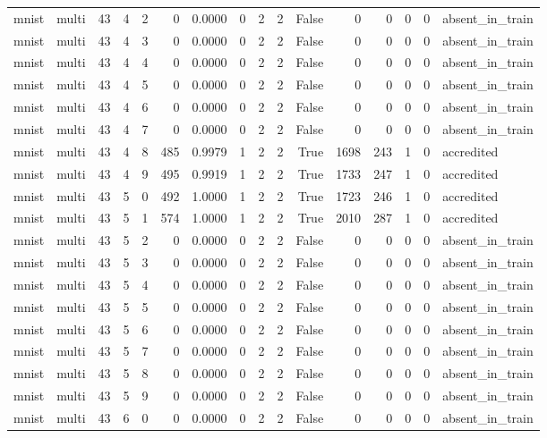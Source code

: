 \begin{tabular}{llrrrrrrrrrrrrrl}
mnist & multi & 43 & 4 & 2 & 0 & 0.0000 & 0 & 2 & 2 & False & 0 & 0 & 0 & 0 & absent\_in\_train \\
mnist & multi & 43 & 4 & 3 & 0 & 0.0000 & 0 & 2 & 2 & False & 0 & 0 & 0 & 0 & absent\_in\_train \\
mnist & multi & 43 & 4 & 4 & 0 & 0.0000 & 0 & 2 & 2 & False & 0 & 0 & 0 & 0 & absent\_in\_train \\
mnist & multi & 43 & 4 & 5 & 0 & 0.0000 & 0 & 2 & 2 & False & 0 & 0 & 0 & 0 & absent\_in\_train \\
mnist & multi & 43 & 4 & 6 & 0 & 0.0000 & 0 & 2 & 2 & False & 0 & 0 & 0 & 0 & absent\_in\_train \\
mnist & multi & 43 & 4 & 7 & 0 & 0.0000 & 0 & 2 & 2 & False & 0 & 0 & 0 & 0 & absent\_in\_train \\
mnist & multi & 43 & 4 & 8 & 485 & 0.9979 & 1 & 2 & 2 & True & 1698 & 243 & 1 & 0 & accredited \\
mnist & multi & 43 & 4 & 9 & 495 & 0.9919 & 1 & 2 & 2 & True & 1733 & 247 & 1 & 0 & accredited \\
mnist & multi & 43 & 5 & 0 & 492 & 1.0000 & 1 & 2 & 2 & True & 1723 & 246 & 1 & 0 & accredited \\
mnist & multi & 43 & 5 & 1 & 574 & 1.0000 & 1 & 2 & 2 & True & 2010 & 287 & 1 & 0 & accredited \\
mnist & multi & 43 & 5 & 2 & 0 & 0.0000 & 0 & 2 & 2 & False & 0 & 0 & 0 & 0 & absent\_in\_train \\
mnist & multi & 43 & 5 & 3 & 0 & 0.0000 & 0 & 2 & 2 & False & 0 & 0 & 0 & 0 & absent\_in\_train \\
mnist & multi & 43 & 5 & 4 & 0 & 0.0000 & 0 & 2 & 2 & False & 0 & 0 & 0 & 0 & absent\_in\_train \\
mnist & multi & 43 & 5 & 5 & 0 & 0.0000 & 0 & 2 & 2 & False & 0 & 0 & 0 & 0 & absent\_in\_train \\
mnist & multi & 43 & 5 & 6 & 0 & 0.0000 & 0 & 2 & 2 & False & 0 & 0 & 0 & 0 & absent\_in\_train \\
mnist & multi & 43 & 5 & 7 & 0 & 0.0000 & 0 & 2 & 2 & False & 0 & 0 & 0 & 0 & absent\_in\_train \\
mnist & multi & 43 & 5 & 8 & 0 & 0.0000 & 0 & 2 & 2 & False & 0 & 0 & 0 & 0 & absent\_in\_train \\
mnist & multi & 43 & 5 & 9 & 0 & 0.0000 & 0 & 2 & 2 & False & 0 & 0 & 0 & 0 & absent\_in\_train \\
mnist & multi & 43 & 6 & 0 & 0 & 0.0000 & 0 & 2 & 2 & False & 0 & 0 & 0 & 0 & absent\_in\_train \\

\end{tabular}
